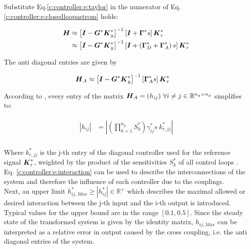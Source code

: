 Substitute Eq.\ref{c:controller:e:taylor} in the numerator of Eq. \ref{c:controller:e:closedloopastrom} holds:

\begin{align}
\begin{split}
\mbox{\boldmath$H$} &\approx \left[ \mbox{\boldmath$I$}  - \mbox{\boldmath$G$}^* \mbox{\boldmath$K$}_y^* \right]^{-1} \left[ \mbox{\boldmath$I$} +  \mbox{\boldmath$\Gamma$}^* s \right] \mbox{\boldmath$K$}_r^* \\
  &\approx \left[ \mbox{\boldmath$I$}  - \mbox{\boldmath$G$}^* \mbox{\boldmath$K$}_y^* \right]^{-1} \left[ \mbox{\boldmath$I$} + \left( \mbox{\boldmath$\Gamma$}^*_D + \mbox{\boldmath$\Gamma$}^*_A \right) s\right] \mbox{\boldmath$K$}_r^* \\
\end{split}
\end{align}

The anti diagonal entries are given by

\begin{align}
\begin{split}
\mbox{\boldmath$H$}_A &\approx \left[ \mbox{\boldmath$I$}  - \mbox{\boldmath$G$}^* \mbox{\boldmath$K$}_y^* \right]^{-1} \left[\mbox{\boldmath$\Gamma$}_A^* s \right] \mbox{\boldmath$K$}_r^*
\end{split}
\end{align}

According to \cite{Astrom2001a}, every entry of the matrix $\mbox{\boldmath$H$}_A = (h_{ij})~\forall i \neq j \in \mathbb{R}^{n_y \times n_y} $ simplifies to:

\begin{align}
\begin{split}
|h_{ij}| &= \left|\left(\prod_{k = 1}^{n_y} S_{k}^*\right)\gamma_{ij}^*s ~k^*_{r,jj} \right| \\
\end{split}
\label{c:controller:e:interaction}
\end{align}

Where $k^*_{r,jj}$ is the j-th entry of the diagonal controller used for the reference signal $\mbox{\boldmath$K$}_r^*$, weighted by the product of the sensitivities $S_k^*$ of all control loops . Eq. \ref{c:controller:e:interaction} can be used to describe the interconnections of the system and therefore the influence of each controller due to the couplings.\\

Next, an upper limit $h_{ij,Max}^* \geq |h_{ij}^*| \in \mathbb{R}^+$ which describes the maximal allowed or desired interaction between the j-th input and the i-th output is introduced. Typical values for the upper bound are in the range $\left[0.1, 0.5\right]$. Since the steady state of the transformed system is given by the identity matrix, $h_{ij,Max}$ can be interpreted as a relative error in output caused by the cross coupling, i.e. the anti diagonal entries of the system. \\

